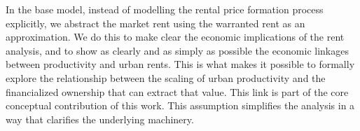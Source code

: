 In the base model, %
instead of modelling the rental price formation process explicitly, we abstract the market rent using the warranted rent as an approximation.
We do this to make clear the economic implications of the rent analysis, and to show as clearly and as simply as possible the economic linkages between productivity and urban rents.
This is what makes it possible to formally explore the relationship between the scaling of urban productivity and the financialized ownership that can extract that value. This link is part of the core conceptual contribution of this work. 
This assumption simplifies the analysis in a way that clarifies the underlying machinery. 


